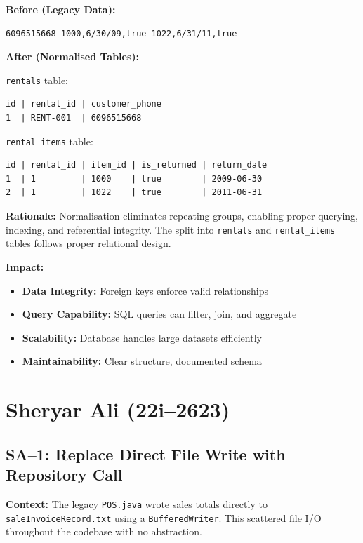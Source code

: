 \textbf{Before (Legacy Data):}
\begin{lstlisting}
6096515668 1000,6/30/09,true 1022,6/31/11,true
\end{lstlisting}

\textbf{After (Normalised Tables):}

\texttt{rentals} table:
\begin{lstlisting}
id | rental_id | customer_phone
1  | RENT-001  | 6096515668
\end{lstlisting}

\texttt{rental\_items} table:
\begin{lstlisting}
id | rental_id | item_id | is_returned | return_date
1  | 1         | 1000    | true        | 2009-06-30
2  | 1         | 1022    | true        | 2011-06-31
\end{lstlisting}

\textbf{Rationale:}
Normalisation eliminates repeating groups, enabling proper querying,
indexing, and referential integrity. The split into \texttt{rentals} and
\texttt{rental\_items} tables follows proper relational design.

\textbf{Impact:}
\begin{itemize}
  \item \textbf{Data Integrity:} Foreign keys enforce valid relationships
  \item \textbf{Query Capability:} SQL queries can filter, join, and aggregate
  \item \textbf{Scalability:} Database handles large datasets efficiently
  \item \textbf{Maintainability:} Clear structure, documented schema
\end{itemize}

\section{Sheryar Ali (22i--2623)}

\subsection{SA--1: Replace Direct File Write with Repository Call}

\textbf{Context:}
The legacy \texttt{POS.java} wrote sales totals directly to
\texttt{saleInvoiceRecord.txt} using a \texttt{BufferedWriter}. This
scattered file I/O throughout the codebase with no abstraction.

